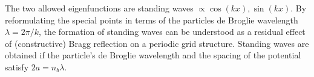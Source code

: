 The two allowed eigenfunctions are standing waves $\propto \cos(kx),\sin(kx)$.
By reformulating the special points in terms of the particles de Broglie wavelength $\lambda=2\pi/k$, the formation of standing waves can be understood as a residual effect of (constructive) Bragg reflection on a periodic grid structure.
Standing waves are obtained if the particle's de Broglie wavelength and the spacing of the potential satisfy $2a=n_b\lambda$.
\begin{figure}
    \centering

\end{figure}
